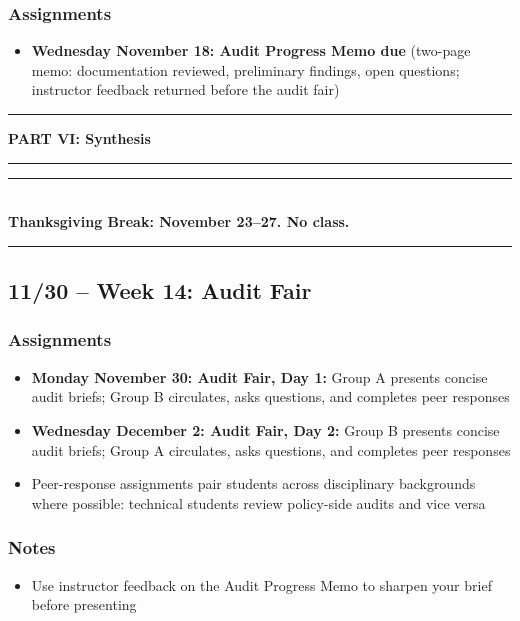 \documentclass[12pt]{article}
\begin{document}
    \subsubsection*{Assignments}
        \begin{itemize}
            \item \textbf{Wednesday November 18: Audit Progress Memo due} (two-page memo: documentation reviewed, preliminary findings, open questions; instructor feedback returned before the audit fair)
        \end{itemize}

\bigskip
\noindent\rule{\textwidth}{0.6pt}
\begin{center}\textbf{PART VI: Synthesis}\end{center}
\noindent\rule{\textwidth}{0.6pt}

\begin{center}
\vspace{0.5em}
\noindent\rule{0.5\textwidth}{0.4pt}\\[0.25em]
\textbf{Thanksgiving Break: November 23--27. No class.}\\[0.25em]
\noindent\rule{0.5\textwidth}{0.4pt}
\vspace{0.5em}
\end{center}

\subsection*{11/30 -- Week 14: Audit Fair}
    \subsubsection*{Assignments}
        \begin{itemize}
            \item \textbf{Monday November 30: Audit Fair, Day 1:} Group A presents concise audit briefs; Group B circulates, asks questions, and completes peer responses
            \item \textbf{Wednesday December 2: Audit Fair, Day 2:} Group B presents concise audit briefs; Group A circulates, asks questions, and completes peer responses
            \item Peer-response assignments pair students across disciplinary backgrounds where possible: technical students review policy-side audits and vice versa
        \end{itemize}
    \subsubsection*{Notes}
        \begin{itemize}
            \item Use instructor feedback on the Audit Progress Memo to sharpen your brief before presenting
        \end{itemize}
\end{document}
